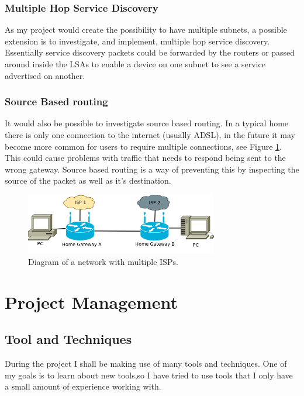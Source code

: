 \documentclass[12pt]{report}
\begin{document}
\subsection{Multiple Hop Service Discovery}
As my project would create the possibility to have multiple subnets, a possible
extension is to investigate, and implement, multiple hop service discovery.
Essentially service discovery packets could be forwarded by the routers or
passed around inside the LSAs to enable a device on one subnet to see a service
advertised on another.

\subsection{Source Based routing}
It would also be possible to investigate source based routing. In a typical home
there is only one connection to the internet (usually ADSL), in the future it
may become more common for users to require multiple connections, see Figure
\ref{fig:MultipleISP}.  This could cause problems with traffic that needs to
respond being sent to the wrong gateway. Source based routing is a way of
preventing this by inspecting the source of the packet as well as it's
destination.

\begin{figure}
\centering
\includegraphics[width=0.75\textwidth]{../Diagrams/Network/MultipleISP.png}
\caption{Diagram of a network with multiple ISPs.}
\label{fig:MultipleISP}
\end{figure}

\chapter{Project Management}

\section{Tool and Techniques}
During the project I shall be making use of many tools and techniques.  One of
my goals is to learn about new tools,so I have tried to use tools that I only
have a small amount of experience working with. 
\end{document}
